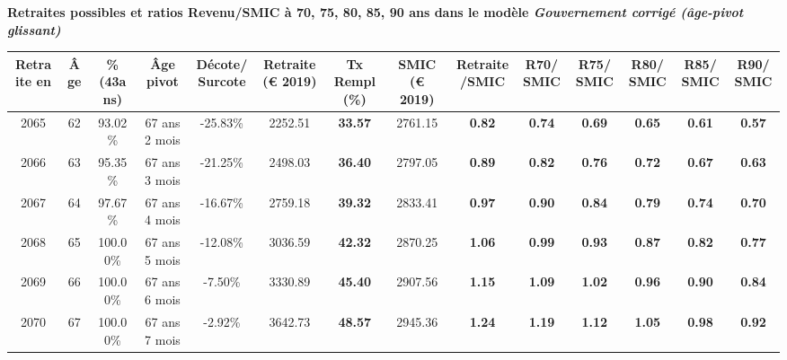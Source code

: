  \vspace{0.1cm} 
{\bf \noindent Retraites possibles et ratios Revenu/SMIC à 70, 75, 80, 85, 90 ans dans le modèle \emph{Gouvernement corrigé (âge-pivot glissant)}}  
 
\begin{adjustbox}{max width=\textwidth} 
\begin{tabular}[htb]{|c|c||c|c|c||c|c||c|c||c|c|c|c|c|} 
\hline 
 Retraite en &  Âge &  \%(43ans) &  Âge pivot &  Décote/Surcote &  Retraite (\euro{} 2019) &  Tx Rempl(\%) &  SMIC (\euro{} 2019) &  Retraite/SMIC &  R70/SMIC &  R75/SMIC &  R80/SMIC &  R85/SMIC &  R90/SMIC \\ 
\hline \hline 
 2065 &  62 &  93.02\% &  67 ans 2 mois &  -25.83\% &  2252.51 &  {\bf 33.57} &  2761.15 &  {\bf {\color{red} 0.82}} &  {\bf {\color{red} 0.74}} &  {\bf {\color{red} 0.69}} &  {\bf {\color{red} 0.65}} &  {\bf {\color{red} 0.61}} &  {\bf {\color{red} 0.57}} \\ 
\hline 
 2066 &  63 &  95.35\% &  67 ans 3 mois &  -21.25\% &  2498.03 &  {\bf 36.40} &  2797.05 &  {\bf {\color{red} 0.89}} &  {\bf {\color{red} 0.82}} &  {\bf {\color{red} 0.76}} &  {\bf {\color{red} 0.72}} &  {\bf {\color{red} 0.67}} &  {\bf {\color{red} 0.63}} \\ 
\hline 
 2067 &  64 &  97.67\% &  67 ans 4 mois &  -16.67\% &  2759.18 &  {\bf 39.32} &  2833.41 &  {\bf {\color{red} 0.97}} &  {\bf {\color{red} 0.90}} &  {\bf {\color{red} 0.84}} &  {\bf {\color{red} 0.79}} &  {\bf {\color{red} 0.74}} &  {\bf {\color{red} 0.70}} \\ 
\hline 
 2068 &  65 &  100.00\% &  67 ans 5 mois &  -12.08\% &  3036.59 &  {\bf 42.32} &  2870.25 &  {\bf 1.06} &  {\bf {\color{red} 0.99}} &  {\bf {\color{red} 0.93}} &  {\bf {\color{red} 0.87}} &  {\bf {\color{red} 0.82}} &  {\bf {\color{red} 0.77}} \\ 
\hline 
 2069 &  66 &  100.00\% &  67 ans 6 mois &  -7.50\% &  3330.89 &  {\bf 45.40} &  2907.56 &  {\bf 1.15} &  {\bf 1.09} &  {\bf 1.02} &  {\bf {\color{red} 0.96}} &  {\bf {\color{red} 0.90}} &  {\bf {\color{red} 0.84}} \\ 
\hline 
 2070 &  67 &  100.00\% &  67 ans 7 mois &  -2.92\% &  3642.73 &  {\bf 48.57} &  2945.36 &  {\bf 1.24} &  {\bf 1.19} &  {\bf 1.12} &  {\bf 1.05} &  {\bf {\color{red} 0.98}} &  {\bf {\color{red} 0.92}} \\ 
\hline 
\hline 
\end{tabular} 
\end{adjustbox} 
 
